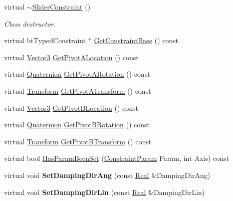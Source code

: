 \begin{DoxyCompactItemize}
\item 
virtual \hyperlink{classMezzanine_1_1SliderConstraint_a61867229e5eb1192119b496b12beb825}{$\sim$SliderConstraint} ()
\begin{DoxyCompactList}\small\item\em Class destructor. \item\end{DoxyCompactList}\item 
virtual btTypedConstraint $\ast$ \hyperlink{classMezzanine_1_1SliderConstraint_afb6bf65099b1d964975ee0853e81e38c}{GetConstraintBase} () const 
\item 
virtual \hyperlink{classMezzanine_1_1Vector3}{Vector3} \hyperlink{classMezzanine_1_1SliderConstraint_aab32a4c00eda5369c8188cff854418bd}{GetPivotALocation} () const 
\item 
virtual \hyperlink{classMezzanine_1_1Quaternion}{Quaternion} \hyperlink{classMezzanine_1_1SliderConstraint_ac53730c289d355e7ed426a9f4b28d6b5}{GetPivotARotation} () const 
\item 
virtual \hyperlink{classMezzanine_1_1Transform}{Transform} \hyperlink{classMezzanine_1_1SliderConstraint_ad87313a0848e2523b4157a07b0a65d23}{GetPivotATransform} () const 
\item 
virtual \hyperlink{classMezzanine_1_1Vector3}{Vector3} \hyperlink{classMezzanine_1_1SliderConstraint_af97a455a53d7572351f6ae725bb8e31b}{GetPivotBLocation} () const 
\item 
virtual \hyperlink{classMezzanine_1_1Quaternion}{Quaternion} \hyperlink{classMezzanine_1_1SliderConstraint_a4550412c47b611ae3238db1adbff20d9}{GetPivotBRotation} () const 
\item 
virtual \hyperlink{classMezzanine_1_1Transform}{Transform} \hyperlink{classMezzanine_1_1SliderConstraint_a22964857b7c94edf895d1ea9812614b1}{GetPivotBTransform} () const 
\item 
virtual bool \hyperlink{classMezzanine_1_1SliderConstraint_a348b148de3759ae80f7af6dbd8680867}{HasParamBeenSet} (\hyperlink{namespaceMezzanine_a6c62e8c2938fb203eb7a7072c12176f4}{ConstraintParam} Param, int Axis) const 
\item 
\hypertarget{classMezzanine_1_1SliderConstraint_a1aabc8e14b95c99374c1b2e408c6095e}{
virtual void {\bfseries SetDampingDirAng} (const \hyperlink{namespaceMezzanine_a726731b1a7df72bf3583e4a97282c6f6}{Real} \&DampingDirAng)}
\label{classMezzanine_1_1SliderConstraint_a1aabc8e14b95c99374c1b2e408c6095e}

\item 
\hypertarget{classMezzanine_1_1SliderConstraint_a1893c48fb1f5cd621e783ae80f7dfdf5}{
virtual void {\bfseries SetDampingDirLin} (const \hyperlink{namespaceMezzanine_a726731b1a7df72bf3583e4a97282c6f6}{Real} \&DampingDirLin)}
\label{classMezzanine_1_1SliderConstraint_a1893c48fb1f5cd621e783ae80f7dfdf5}


\end{DoxyCompactItemize}
